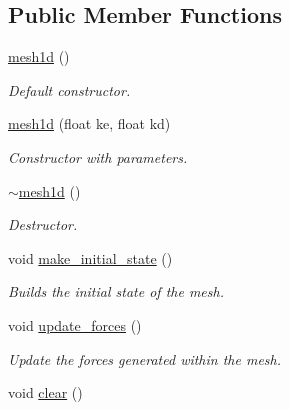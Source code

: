 \subsection*{Public Member Functions}
\begin{DoxyCompactItemize}
\item 
\mbox{\label{classphysim_1_1meshes_1_1mesh1d_a6fe979fbcab7ff4534044d8d6fc9071e}} 
\hyperlink{classphysim_1_1meshes_1_1mesh1d_a6fe979fbcab7ff4534044d8d6fc9071e}{mesh1d} ()
\begin{DoxyCompactList}\small\item\em Default constructor. \end{DoxyCompactList}\item 
\hyperlink{classphysim_1_1meshes_1_1mesh1d_a75cb535a4e9a65b8b1f269b02224b4cc}{mesh1d} (float ke, float kd)
\begin{DoxyCompactList}\small\item\em Constructor with parameters. \end{DoxyCompactList}\item 
\mbox{\label{classphysim_1_1meshes_1_1mesh1d_a8b34a93773ce6e9bfb725510d77e58fc}} 
\hyperlink{classphysim_1_1meshes_1_1mesh1d_a8b34a93773ce6e9bfb725510d77e58fc}{$\sim$mesh1d} ()
\begin{DoxyCompactList}\small\item\em Destructor. \end{DoxyCompactList}\item 
void \hyperlink{classphysim_1_1meshes_1_1mesh1d_a6f2275fbab0ddfcbf523cc5a359e1d9c}{make\+\_\+initial\+\_\+state} ()
\begin{DoxyCompactList}\small\item\em Builds the initial state of the mesh. \end{DoxyCompactList}\item 
void \hyperlink{classphysim_1_1meshes_1_1mesh1d_abc53d477a2999654e09cabb0b5fd15ff}{update\+\_\+forces} ()
\begin{DoxyCompactList}\small\item\em Update the forces generated within the mesh. \end{DoxyCompactList}\item 
\mbox{\label{classphysim_1_1meshes_1_1mesh1d_a1fe7bdb4b6775eccea56b40e4477c4a8}} 
void \hyperlink{classphysim_1_1meshes_1_1mesh1d_a1fe7bdb4b6775eccea56b40e4477c4a8}{clear} ()

\end{DoxyCompactItemize}
